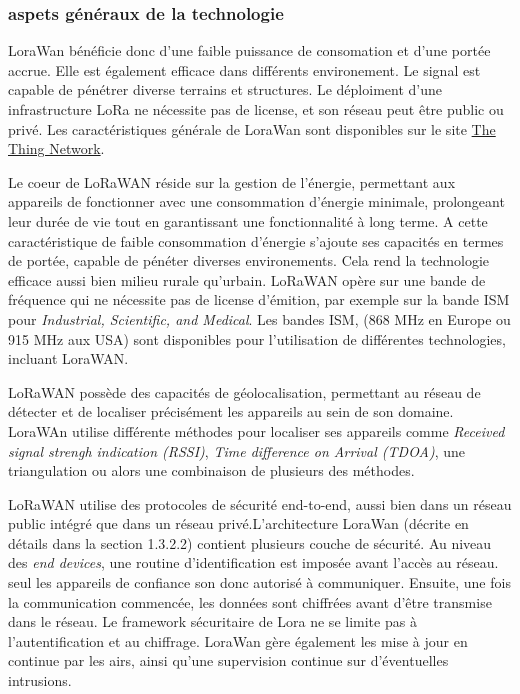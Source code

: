 \subsubsection{aspets généraux de la technologie}

LoraWan bénéficie donc d'une faible puissance de consomation et d'une portée accrue. Elle est également efficace dans différents environement. Le signal est capable de pénétrer diverse terrains et structures.
Le déploiment d'une infrastructure LoRa ne nécessite pas de license, et son réseau peut être public ou privé. Les caractéristiques générale de LoraWan sont disponibles sur le site \href{https://www.thethingsnetwork.org/docs/lorawan/}{The Thing Network}.

\vspace{0.1cm}

Le coeur de LoRaWAN réside sur la gestion de l'énergie, permettant aux appareils de fonctionner avec une consommation d'énergie minimale, prolongeant leur durée de vie tout en garantissant une fonctionnalité à long terme. A cette caractéristique de faible consommation d'énergie s'ajoute ses capacités en termes de portée, capable de pénéter diverses environements. Cela rend la technologie efficace aussi bien milieu rurale qu'urbain. LoRaWAN opère sur une bande de fréquence qui ne nécessite pas de license d'émition, par exemple sur la bande ISM pour \textit{Industrial, Scientific, and Medical}. Les bandes ISM, (868 MHz en Europe ou 915 MHz aux USA) sont disponibles pour l'utilisation de différentes technologies, incluant LoraWAN.

\vspace{0.1cm}

LoRaWAN possède des capacités de géolocalisation, permettant au réseau de détecter et de localiser précisément les appareils au sein de son domaine. LoraWAn utilise différente méthodes pour localiser ses appareils comme \textit{Received signal strengh indication (RSSI)}, \textit{Time difference on Arrival (TDOA)}, une triangulation ou alors une combinaison de plusieurs des méthodes.

\vspace{0.1cm}

LoRaWAN utilise des protocoles de sécurité end-to-end, aussi bien dans un réseau public intégré que dans un réseau privé.L'architecture LoraWan (décrite en détails dans la section 1.3.2.2) contient plusieurs couche de sécurité. Au niveau des \textit{end devices}, une routine d'identification est imposée avant l'accès au réseau. seul les appareils de confiance son donc autorisé à communiquer. Ensuite, une fois la communication commencée, les données sont chiffrées avant d'être transmise dans le réseau. Le framework sécuritaire de Lora ne se limite pas à l'autentification et au chiffrage. LoraWan gère également les mise à jour en continue par les airs, ainsi qu'une supervision continue sur d'éventuelles intrusions.

